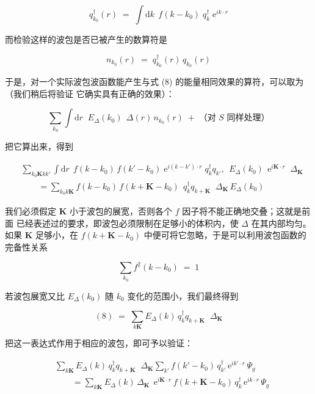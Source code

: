 \begin{equation*}
q_{k_{0}}^{\dagger}(r) \;=\; \int \mathrm{d}k\;\, f(k-k_{0})\; q_{k}^{\dagger}\; \mathrm{e}^{ik\cdot r}
\end{equation*}

而检验这样的波包是否已被产生的数算符是

\begin{equation*}
n_{k_{0}}(r) \;=\; q_{k_{0}}^{\dagger}(r)\, q_{k_{0}}(r)
\end{equation*}

于是，对一个实际波包波函数能产生与式 (8) 的能量相同效果的算符，可以取为（我们稍后将验证
它确实具有正确的效果）：

\begin{equation*}
\sum_{k_{0}} \int \mathrm{d}r\;\; E_{\Delta}(k_{0})\;\, \Delta(r)\, n_{k_{0}}(r) \;+\; \text{（对 } S \text{ 同样处理）}
\end{equation*}

把它算出来，得到

\begin{align*}
& \sum_{k_{0}\mathbf{K}kk'} \int \mathrm{d}r\;\, f(k-k_{0})\, f(k'-k_{0})\;
\mathrm{e}^{i(k-k')\cdot r}\; q_{k}^{\dagger} q_{k'},\;\, E_{\Delta}(k_{0})\;\, \mathrm{e}^{i\mathbf{K}\cdot r}\;\; \Delta_{\mathbf{K}} \\
& \qquad = \sum_{k_{0}k\mathbf{K}} f(k-k_{0})\, f(k+\mathbf{K}-k_{0})\;\, q_{k}^{\dagger} q_{k+\mathbf{K}}\;\; \Delta_{\mathbf{K}}\, E_{\Delta}(k_{0})
\end{align*}

我们必须假定 $\mathbf{K}$ 小于波包的展宽，否则各个 $f$ 因子将不能正确地交叠；这就是前面
已经表述过的要求，即波包必须限制在足够小的体积内，使 $\Delta$ 在其内部均匀。如果
$\mathbf{K}$ 足够小，在 $f(k+\mathbf{K}-k_{0})$ 中便可将它忽略，于是可以利用波包函数的
完备性关系

\begin{equation*}
\sum_{k_{0}} f^{2}(k-k_{0}) \;=\; 1
\end{equation*}

若波包展宽又比 $E_{\Delta}(k_{0})$ 随 $k_{0}$ 变化的范围小，我们最终得到

\begin{equation*}
(8) \;=\; \sum_{k\mathbf{K}} E_{\Delta}(k)\, q_{k}^{\dagger} q_{k+\mathbf{K}}\;\; \Delta_{\mathbf{K}}
\tag{9}
\end{equation*}

把这一表达式作用于相应的波包，即可予以验证：

\begin{align*}
& \sum_{k\mathbf{K}} E_{\Delta}(k)\, q_{k}^{\dagger} q_{k+\mathbf{K}}\;\; \Delta_{\mathbf{K}} \sum_{k'} f(k'-k_{0})\, q_{k'}^{\dagger}\, \mathrm{e}^{ik'\cdot r}\, \Psi_{g} \\
& \qquad = \sum_{k\mathbf{K}} E_{\Delta}(k)\, \Delta_{\mathbf{K}}\;\, \mathrm{e}^{i\mathbf{K}\cdot r}\, f(k+\mathbf{K}-k_{0})\, q_{k}^{\dagger}\, \mathrm{e}^{ik\cdot r}\, \Psi_{g}
\end{align*}


